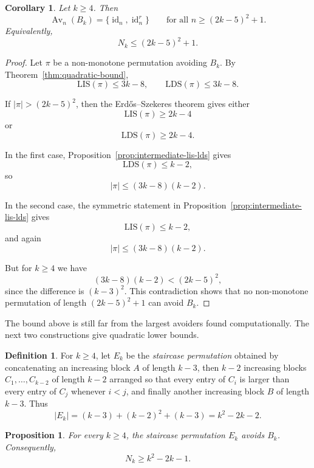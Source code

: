 \documentclass[11pt]{amsart}
\newcommand{\Av}{\operatorname{Av}}
\newcommand{\id}{\operatorname{id}}
\theoremstyle{plain}
\newtheorem{proposition}[theorem]{Proposition}
\newtheorem{corollary}[theorem]{Corollary}
\theoremstyle{definition}
\newtheorem{definition}[theorem]{Definition}
\theoremstyle{remark}
\begin{document}
\begin{corollary}\label{cor:better-quadratic-bound}
  Let $k \geq 4$.  Then
  \[
    \Av_n(B_k)=\{\id_n,\id_n^r\}\qquad\text{for all }n \geq (2k-5)^2+1.
  \]
  Equivalently,
  \[
    N_k \leq (2k-5)^2+1.
  \]
\end{corollary}

\begin{proof}
  Let $\pi$ be a non-monotone permutation avoiding $B_k$.  By Theorem~\ref{thm:quadratic-bound},
  \[
    \mathrm{LIS}(\pi)\leq 3k-8,\qquad \mathrm{LDS}(\pi)\leq 3k-8.
  \]

  If $|\pi|>(2k-5)^2$, then the Erd\H{o}s--Szekeres theorem gives either
  \[
    \mathrm{LIS}(\pi)\geq 2k-4
  \]
  or
  \[
    \mathrm{LDS}(\pi)\geq 2k-4.
  \]

  In the first case, Proposition~\ref{prop:intermediate-lis-lds} gives
  \[
    \mathrm{LDS}(\pi)\leq k-2,
  \]
  so
  \[
    |\pi|\leq (3k-8)(k-2).
  \]

  In the second case, the symmetric statement in Proposition~\ref{prop:intermediate-lis-lds} gives
  \[
    \mathrm{LIS}(\pi)\leq k-2,
  \]
  and again
  \[
    |\pi|\leq (3k-8)(k-2).
  \]

  But for $k \geq 4$ we have
  \[
    (3k-8)(k-2)<(2k-5)^2,
  \]
  since the difference is $(k-3)^2$.  This contradiction shows that no non-monotone permutation of
  length $(2k-5)^2+1$ can avoid $B_k$.
\end{proof}

The bound above is still far from the largest avoiders found computationally.
The next two constructions give quadratic lower bounds.
\begin{definition}
  For $k \geq 4$, let $E_k$ be the \emph{staircase permutation} obtained by concatenating an increasing block $A$ of
  length $k-3$, then $k-2$ increasing blocks $C_1,\dots,C_{k-2}$ of length $k-2$ arranged so that
  every entry of $C_i$ is larger than every entry of $C_j$ whenever $i<j$, and finally another
  increasing block $B$ of length $k-3$.  Thus
  \[
    |E_k|=(k-3)+(k-2)^2+(k-3)=k^2-2k-2.
  \]
\end{definition}

\begin{proposition}\label{prop:staircase-lower-bound}
  For every $k \geq 4$, the staircase permutation $E_k$ avoids $B_k$.  Consequently,
  \[
    N_k \geq k^2-2k-1.
  \]
\end{proposition}
\end{document}

